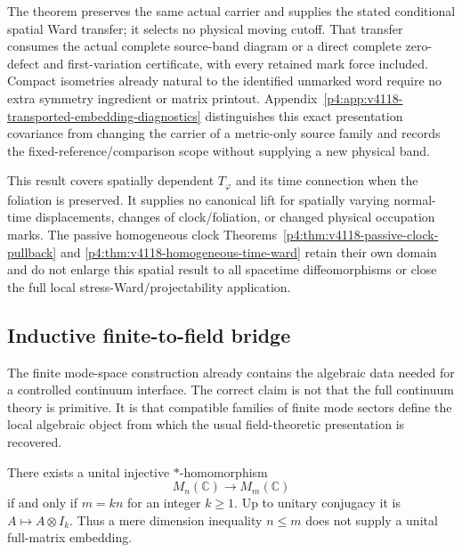 \documentclass[12pt,a4paper]{article}
\begin{document}
The theorem preserves the same actual carrier and supplies the stated
conditional spatial Ward transfer; it selects no physical moving cutoff.
That transfer consumes the actual complete source-band diagram or a direct
complete zero-defect and first-variation certificate, with every retained
mark force included. Compact isometries already natural to the identified
unmarked word require no extra symmetry ingredient or matrix printout.
Appendix~\ref{p4:app:v4118-transported-embedding-diagnostics} distinguishes
this exact presentation covariance from changing the carrier of a
metric-only source family and records the fixed-reference/comparison
scope without supplying a new physical band.

This result covers spatially dependent $T_\varphi$ and its time connection
when the foliation is preserved. It supplies no canonical lift for
spatially varying normal-time displacements, changes of clock/foliation,
or changed physical occupation marks. The passive homogeneous clock
Theorems~\ref{p4:thm:v4118-passive-clock-pullback} and
\ref{p4:thm:v4118-homogeneous-time-ward} retain their own domain and do
not enlarge this spatial result to all spacetime diffeomorphisms or close
the full local stress-Ward/projectability application.






\subsection{Inductive finite-to-field bridge}
\label{p4:sec:part2-inductive-field-bridge}

The finite mode-space construction already contains the algebraic data needed for a controlled continuum interface.
The correct claim is not that the full continuum theory is primitive.
It is that compatible families of finite mode sectors define the local algebraic object from which the usual field-theoretic presentation is recovered.

\begin{lemma}
\label{p4:lem:matrix-embedding-divisibility}
There exists a unital injective \(*\)-homomorphism
\[
 M_n(\mathbb C)\longrightarrow M_m(\mathbb C)
\]
if and only if \(m=kn\) for an integer \(k\ge1\).  Up to unitary conjugacy it
is \(A\mapsto A\otimes I_k\).  Thus a mere dimension inequality \(n\le m\)
does not supply a unital full-matrix embedding.
\end{lemma}
\end{document}
